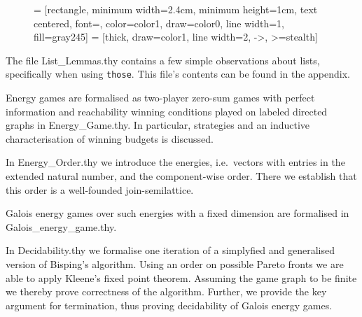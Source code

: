 \begin{figure}[H]
\begin{center}


 = [rectangle, minimum width=2.4cm, minimum height=1cm, text centered, font=\normalsize, color=color1, draw=color0, line width=1, fill=gray245]
 = [thick, draw=color1, line width=2, ->, >=stealth]

\end{center}
\end{figure}

The file List\_Lemmas.thy contains a few simple observations about lists, specifically when using \texttt{those}. This file's contents can be found in the appendix.

Energy games are formalised as two-player zero-sum games with perfect information and reachability winning conditions played on labeled directed graphs in Energy\_Game.thy. 
In particular, strategies and an inductive characterisation of winning budgets is discussed.

In Energy\_Order.thy we introduce the energies, i.e.\ vectors with entries in the extended natural number, and the component-wise order. There we establish that this order is a well-founded join-semilattice. 

Galois energy games over such energies with a fixed dimension are formalised in Galois\_energy\_game.thy. 

In Decidability.thy we formalise one iteration of a simplyfied and generalised version of Bisping's algorithm. Using an order on possible Pareto fronts we are able to apply Kleene's fixed point theorem. Assuming the game graph to be finite we thereby prove correctness of the algorithm. Further, we provide the key argument for termination, thus proving decidability of Galois energy games.

